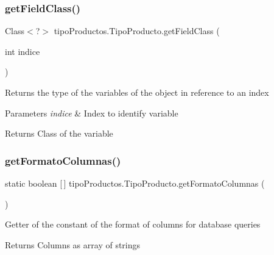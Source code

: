 \subsubsection{\texorpdfstring{get\+Field\+Class()}{getFieldClass()}}
{\footnotesize\ttfamily Class$<$?$>$ tipo\+Productos.\+Tipo\+Producto.\+get\+Field\+Class (\begin{DoxyParamCaption}\item[{int}]{indice }\end{DoxyParamCaption})}

Returns the type of the variables of the object in reference to an index


\begin{DoxyParams}{Parameters}
{\em indice} & Index to identify variable \\
\hline
\end{DoxyParams}
\begin{DoxyReturn}{Returns}
Class of the variable 
\end{DoxyReturn}
\mbox{\label{classtipo_productos_1_1_tipo_producto_ad2401fcfc8d348edc222e4a39ad00179}} 
\subsubsection{\texorpdfstring{get\+Formato\+Columnas()}{getFormatoColumnas()}}
{\footnotesize\ttfamily static boolean \mbox{[}$\,$\mbox{]} tipo\+Productos.\+Tipo\+Producto.\+get\+Formato\+Columnas (\begin{DoxyParamCaption}{ }\end{DoxyParamCaption})\hspace{0.3cm}{\ttfamily [static]}}

Getter of the constant of the format of columns for database queries

\begin{DoxyReturn}{Returns}
Columns as array of strings 
\end{DoxyReturn}
\mbox{\label{classtipo_productos_1_1_tipo_producto_aede2d99770807b639e1e3f9f75dd2f65}} 
